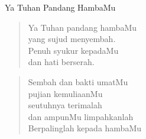\begin{center}
Ya Tuhan Pandang HambaMu
\end{center}

\begin{verse}
Ya Tuhan pandang hambaMu \\
yang sujud menyembah.\\
Penuh syukur kepadaMu \\
dan hati berserah.\\
\end{verse}

\begin{verse}
Sembah dan bakti umatMu\\ 
pujian kemuliaanMu\\
seutuhnya terimalah \\
dan ampunMu limpahkanlah\\
Berpalinglah kepada hambaMu
\end{verse}
